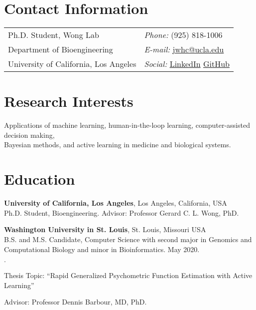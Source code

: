 \documentclass[line,margin]{res}
\newenvironment{list2}{
  \begin{list}{\boldmath$\cdot$}{%
      \setlength{\itemsep}{0in}
      \setlength{\parsep}{0in} \setlength{\parskip}{0in}
      \setlength{\topsep}{0in} \setlength{\partopsep}{0in}
      \setlength{\leftmargin}{0.2in}}}{\end{list}}
\begin{document}
\vspace*{-0.5in}

\begin{resume}
\section{\sc Contact Information}
\vspace{.05in}
\begin{tabularx}{\textwidth}{@{} X @{} X @{}}
Ph.D. Student, Wong Lab & {\it Phone:} (925) 818-1006 \\
Department of Bioengineering & {\it E-mail:} \href{mailto:jwhc@ucla.edu}{jwhc@ucla.edu} \\
University of California, Los Angeles & {\it Social:}
\href{https://www.linkedin.com/in/jonathan-chen-54648478/}{LinkedIn}
\href{https://github.com/jowch}{GitHub}
\end{tabularx}


\section{\sc Research Interests}
Applications of machine learning, human-in-the-loop learning,
computer-assisted decision making, \\ Bayesian methods, and
active learning in medicine and biological systems.


\section{\sc Education}
{\bf University of California, Los Angeles}, Los Angeles, California, USA \vspace{0.3em} \\
Ph.D. Student, Bioengineering. Advisor: Professor Gerard C. L. Wong, PhD.

{\bf Washington University in St. Louis}, St. Louis, Missouri USA \vspace{0.3em} \\
B.S. and M.S. Candidate, Computer Science with second major in Genomics
and Computational Biology and minor in Bioinformatics. May 2020.
\vspace*{0.3em}
\begin{list2}
\vspace*{.05in}
\item Thesis Topic: ``Rapid Generalized Psychometric Function Estimation
with Active Learning''
\item Advisor: Professor Dennis Barbour, MD, PhD.
\end{list2}



\end{resume}
\end{document}
